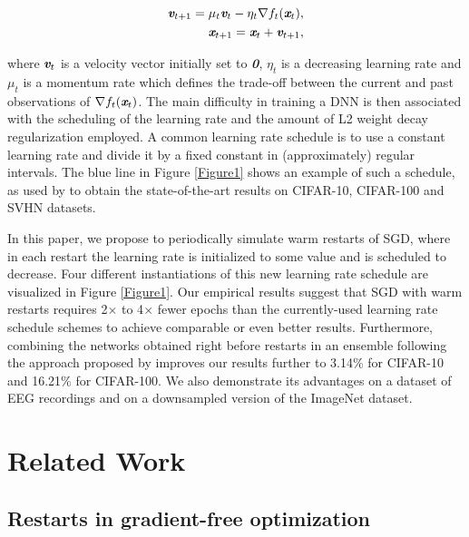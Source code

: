 \documentclass{article}
\newcommand{\vc}[1]{\textit{\textbf{#1}}}
\begin{document}
\begin{eqnarray}
	\vc{v}_{t+1} = \mu_t \vc{v}_t  - \eta_t \nabla f_t(\vc{x}_t), \label{eq:moms1} \\
	\vc{x}_{t+1} = \vc{x}_t + \vc{v}_{t+1}, \label{eq:moms2}
\end{eqnarray}

where $\vc{v}_t$ is a velocity vector initially set to \vc{0}, $\eta_t$ is a decreasing learning rate and $\mu_t$ is a momentum rate which defines the trade-off between the current and past observations of $\nabla f_t(\vc{x}_t)$. 
The main difficulty in training a DNN is then associated with the scheduling of the learning rate and the amount of L2 weight decay regularization employed. A common learning rate schedule is to use a constant learning rate and divide it by a fixed constant in (approximately) regular intervals. The blue line in Figure \ref{Figure1} shows an example of such a schedule, as used by \cite{zagoruyko2016wide} to obtain the state-of-the-art results on CIFAR-10, CIFAR-100 and SVHN datasets. 

In this paper, we propose to periodically simulate warm restarts of SGD, where in each restart the learning rate is initialized to some value and is scheduled to decrease. Four different instantiations of this new learning rate schedule are visualized in Figure \ref{Figure1}. Our empirical results suggest that SGD with warm restarts requires 2$\times$ to 4$\times$ fewer epochs than the currently-used learning rate schedule schemes to achieve comparable or even better results. Furthermore, combining the networks obtained right before restarts in an ensemble following the approach proposed by \cite{SnapshotICLR2017} improves our results further to 3.14\% for CIFAR-10 and 16.21\% for CIFAR-100. We also demonstrate its advantages on a dataset of EEG recordings and on a downsampled version of the ImageNet dataset.

\section{Related Work}

\subsection{Restarts in gradient-free optimization}
\end{document}
